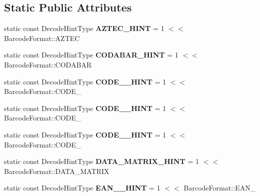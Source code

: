 \subsection*{Static Public Attributes}
\begin{DoxyCompactItemize}
\item 
\mbox{\label{classzxing_1_1_decode_hints_ac2dd677d039e150f3ab2bfe40fa25675}} 
static const Decode\+Hint\+Type {\bfseries A\+Z\+T\+E\+C\+\_\+\+H\+I\+NT} = 1 $<$$<$ Barcode\+Format\+::\+A\+Z\+T\+EC
\item 
\mbox{\label{classzxing_1_1_decode_hints_ab46c7fac9e49df7037c5901dcafd5d23}} 
static const Decode\+Hint\+Type {\bfseries C\+O\+D\+A\+B\+A\+R\+\_\+\+H\+I\+NT} = 1 $<$$<$ Barcode\+Format\+::\+C\+O\+D\+A\+B\+AR
\item 
\mbox{\label{classzxing_1_1_decode_hints_a927c16e6ba78b4502a18c273c7bc2b0b}} 
static const Decode\+Hint\+Type {\bfseries C\+O\+D\+E\+\_\+\_\+\+H\+I\+NT} = 1 $<$$<$ Barcode\+Format\+::\+C\+O\+D\+E\+\_
\item 
\mbox{\label{classzxing_1_1_decode_hints_a23774828af22e0a58cab3b2100fb9935}} 
static const Decode\+Hint\+Type {\bfseries C\+O\+D\+E\+\_\+\_\+\+H\+I\+NT} = 1 $<$$<$ Barcode\+Format\+::\+C\+O\+D\+E\+\_
\item 
\mbox{\label{classzxing_1_1_decode_hints_a75870da600a1d72a49b82def1d8c3f48}} 
static const Decode\+Hint\+Type {\bfseries C\+O\+D\+E\+\_\+\_\+\+H\+I\+NT} = 1 $<$$<$ Barcode\+Format\+::\+C\+O\+D\+E\+\_
\item 
\mbox{\label{classzxing_1_1_decode_hints_a60be5ab150f214bd6540783306c093db}} 
static const Decode\+Hint\+Type {\bfseries D\+A\+T\+A\+\_\+\+M\+A\+T\+R\+I\+X\+\_\+\+H\+I\+NT} = 1 $<$$<$ Barcode\+Format\+::\+D\+A\+T\+A\+\_\+\+M\+A\+T\+R\+IX
\item 
\mbox{\label{classzxing_1_1_decode_hints_a74e44336a05e424d619ce7eaf3caed71}} 
static const Decode\+Hint\+Type {\bfseries E\+A\+N\+\_\+\_\+\+H\+I\+NT} = 1 $<$$<$ Barcode\+Format\+::\+E\+A\+N\+\_
\item 
$$
\end{DoxyCompactItemize}
